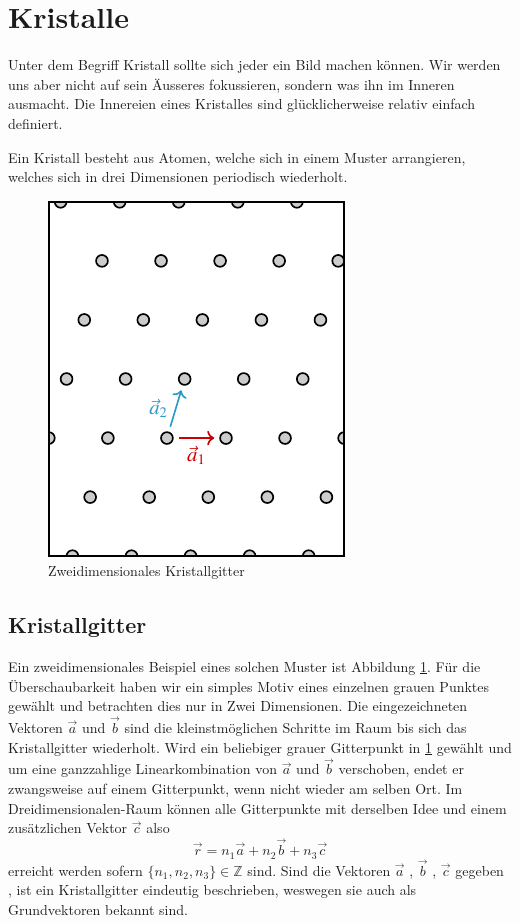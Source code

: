 \section{Kristalle}
Unter dem Begriff Kristall sollte sich jeder ein Bild machen können. 
Wir werden uns aber nicht auf sein Äusseres fokussieren, sondern was ihn im Inneren ausmacht.
Die Innereien eines Kristalles sind glücklicherweise relativ einfach definiert.
\begin{definition}[Kristall]
    Ein Kristall besteht aus Atomen, welche sich in einem Muster arrangieren, welches sich in drei Dimensionen periodisch wiederholt.
\end{definition}

\begin{figure}
    \centering
    \includegraphics[]{papers/punktgruppen/figures/lattice}
    \caption{
        Zweidimensionales Kristallgitter
        \label{fig:punktgruppen:lattice}
    }
\end{figure}
\subsection{Kristallgitter}
Ein zweidimensionales Beispiel eines solchen Muster ist Abbildung \ref{fig:punktgruppen:lattice}.
Für die Überschaubarkeit haben wir ein simples Motiv eines einzelnen grauen Punktes gewählt und betrachten dies nur in Zwei Dimensionen.
Die eingezeichneten Vektoren $\vec{a}$ und $\vec{b}$ sind die kleinstmöglichen Schritte im Raum bis sich das Kristallgitter wiederholt.
Wird ein beliebiger grauer Gitterpunkt in \ref{fig:punktgruppen:lattice} gewählt 
und um eine ganzzahlige Linearkombination von $\vec{a}$ und $\vec{b}$ verschoben, 
endet er zwangsweise auf einem Gitterpunkt, wenn nicht wieder am selben Ort.
Im Dreidimensionalen-Raum können alle Gitterpunkte mit derselben Idee und einem zusätzlichen Vektor $\vec{c}$ also 
\[
    \vec{r} = n_1 \vec{a} + n_2 \vec{b} + n_3 \vec{c}   
\]
erreicht werden sofern $\{n_1,n_2,n_3\} \in \mathbb{Z}$ sind.
Sind die Vektoren  $\vec{a}$ , $\vec{b}$ , $\vec{c}$ gegeben ,
ist ein Kristallgitter eindeutig beschrieben, weswegen sie  auch als Grundvektoren bekannt sind.

